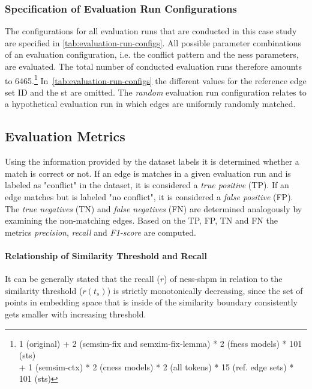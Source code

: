 \documentclass[11pt]{scrreprt}
\begin{document}
{\subsubsection{Specification of Evaluation Run Configurations}
\label{sec:evaluation-configurations}
The configurations for all evaluation runs that are conducted in this case study are specified in \cref{tab:evaluation-run-configs}. All possible parameter combinations of an evaluation configuration, i.e. the conflict pattern and the \gls{ness} parameters, are evaluated. The total number of conducted evaluation runs therefore amounts to 6465.\footnote{1 (original) + 2 (semsim-fix and semxim-fix-lemma) * 2 (\gls{fness} models) * 101 (\gls{st}s) \\ + 1 (semsim-ctx) * 2 (\gls{cness} models) * 2 (all tokens) * 15 (ref. edge sets) * 101 (\gls{st}s)} In \cref{tab:evaluation-run-configs} the different values for the reference edge set ID and the \gls{st} are omitted. The \textit{random} evaluation run configuration relates to a hypothetical evaluation run in which edges are uniformly randomly matched. 


\subsection{Evaluation Metrics}
\label{sec:evaluation-metrics}
Using the information provided by the dataset labels it is determined whether a match is correct or not. If an edge is matches in a given evaluation run and is labeled as "conflict" in the dataset, it is considered a \textit{true positive} (TP). If an edge matches but is labeled "no conflict", it is considered a \textit{false positive} (FP). The \textit{true negatives} (TN) and \textit{false negatives} (FN) are determined analogously  by examining the non-matching edges. Based on the TP, FP, TN and FN the metrics \textit{precision}, \textit{recall} and \textit{F1-score} are computed. 

\paragraph{Relationship of Similarity Threshold and Recall}
It can be generally stated that the recall (\(r\)) of \gls{ness-shpm} in relation to the similarity threshold (\(r(t_s)\)) is strictly monotonically decreasing, since the set of points in embedding space that is inside of the similarity boundary consistently gets smaller with increasing threshold. 

}
\end{document}
